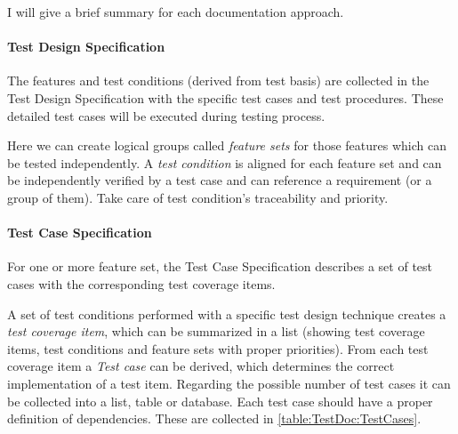 I will give a brief summary for each documentation approach.

\paragraph{Test Design Specification} \label{TestDoc:TDS}
The features and test conditions (derived from test basis) are collected in the Test Design Specification with the specific test cases and test procedures. These detailed test cases will be executed during testing process. 

Here we can create logical groups called \textit{feature sets} for those features which can be tested independently.  A \textit{test condition} is aligned for each feature set and can be independently verified by a test case and can reference a requirement (or a group of them). Take care of test condition's traceability and priority.

\paragraph{Test Case Specification}
For one or more feature set, the Test Case Specification describes a set of test cases with the corresponding test coverage items.

A set of test conditions performed with a specific test design technique creates a \textit{test coverage item}, which can be summarized in a list (showing test coverage items, test conditions and feature sets with proper priorities). From each test coverage item a \textit{Test case} can be derived, which determines the correct implementation of a test item. Regarding the possible number of test cases it can be collected into a list, table or database. 
Each test case should have a proper definition of dependencies. These are collected in \autoref{table:TestDoc:TestCases}.

